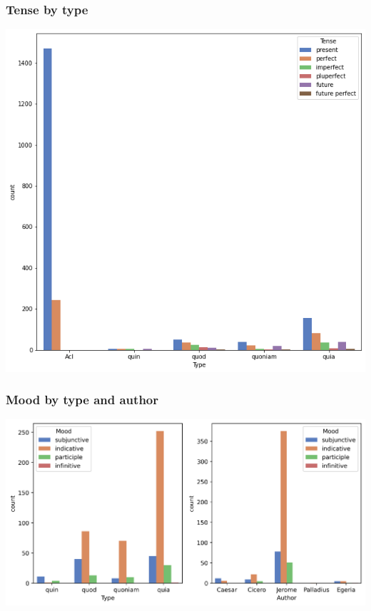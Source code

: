 \documentclass{beamer}
\begin{document}
\begin{frame}
\frametitle{Tense by type}
\begin{center}
    \includegraphics[width=\textwidth,height=0.8\textheight,keepaspectratio]{graphs/tense_by_type.png}
\end{center}
\end{frame}

\begin{frame}
\frametitle{Mood by type and author}
\begin{center}
    \includegraphics[width=\textwidth,height=\textheight,keepaspectratio]{graphs/mood_by_type_auth.png}
\end{center}
\end{frame}
\end{document}
